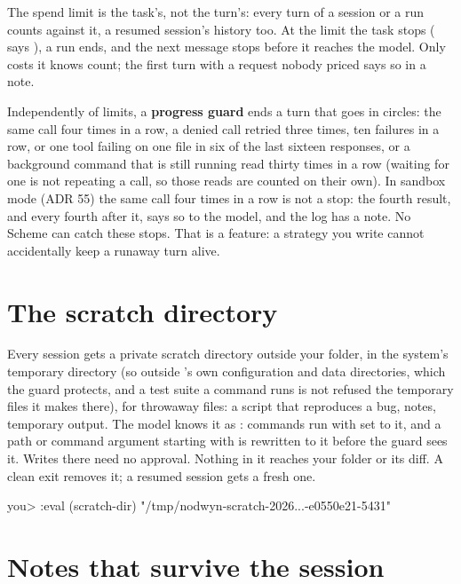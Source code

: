 The spend limit is the task's, not the turn's: every turn of a session or a
run counts against it, a resumed session's history too. At the limit the
task stops ( says ), a run ends, and the
next message stops before it reaches the model. Only costs it knows count;
the first turn with a request nobody priced says so in a note.

Independently of limits, a \textbf{progress guard} ends a turn that goes in
circles: the same call four times in a row, a denied call retried three
times, ten failures in a row, or one tool failing on one file in six of the
last sixteen responses, or a background command that is still running
read thirty times in a row (waiting for one is not repeating a call, so
those reads are counted on their own). In sandbox mode (ADR 55) the same
call four times in a row is not a stop: the fourth result, and every fourth
after it, says so to the model, and the log has a 
note. No Scheme can catch these stops. That is a
feature: a strategy you write cannot accidentally keep a runaway turn alive.

\section{The scratch directory}

Every session gets a private scratch directory outside your folder, in the
system's temporary directory (so outside \nodwyn's own configuration and
data directories, which the guard protects, and a test suite a command runs
is not refused the temporary files it makes there), for throwaway files: a
script that reproduces a bug, notes, temporary output. The model knows it as : commands run with  set to
it, and a path or command argument starting with  is
rewritten to it before the guard sees it. Writes there need no approval.
Nothing in it reaches your folder or its diff. A clean exit removes it; a
resumed session gets a fresh one.

\begin{tryit}
\begin{txt}
you> :eval (scratch-dir)
"/tmp/nodwyn-scratch-2026...-e0550e21-5431"
\end{txt}
\end{tryit}

\section{Notes that survive the session}

